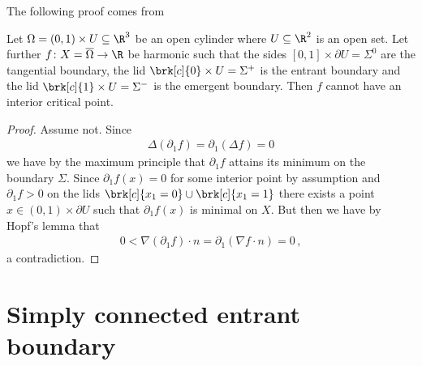 The following proof comes from \cite{Wahlen2023}
\begin{proposition}
  Let $\Omega=(0,1)\times U\subseteq\R^3$ be an open cylinder where $U\subseteq\R^2$ is an open set.
  Let further $f\colon X=\overline{\Omega}\to\R$ be
  harmonic such that the sides
  $[0,1]\times \partial U=\Sigma^0$ are the tangential boundary,
  the lid $\brk[c]{0}\times U=\Sigma^+$ is the entrant boundary and
  the lid $\brk[c]{1}\times U=\Sigma^-$ is the emergent boundary. 
  Then $f$ cannot have an interior critical point.
\end{proposition}
\begin{proof}
  Assume not. Since
  \begin{align*}
    \Delta(\partial_1f)=\partial_1(\Delta f)=0
  \end{align*}
  we have by the maximum principle that $\partial_1 f$ attains its minimum on the boundary $\Sigma$. Since $\partial_1 f(x)=0$ for some interior point 
  by assumption and $\partial_1 f>0$ on the lids $\brk[c]{x_1=0}\cup\brk[c]{x_1=1}$ there exists a point
  $x\in(0,1)\times \partial U$ such that $\partial_1f(x)$ is minimal on $X$. But then we have by Hopf's lemma
  that
  \begin{align*}
    0<\nabla (\partial_1f)\cdot n=\partial_1(\nabla f\cdot n)=0\,,
  \end{align*}
  a contradiction.
\end{proof}

\section{Simply connected entrant boundary}

